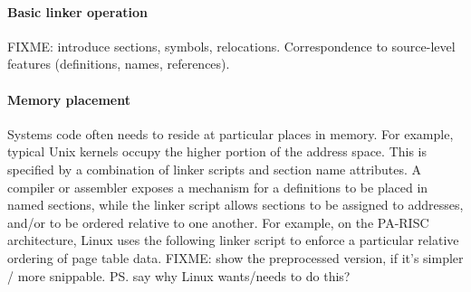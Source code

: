 


% 
% 
% 
% 
% 







\paragraph{Basic linker operation}
FIXME: introduce sections, symbols, relocations.
Correspondence to source-level features (definitions, names, references).

\paragraph{Memory placement}
Systems code often needs to reside at particular places in memory.
For example, typical Unix kernels occupy the higher portion of the address space.
This is specified by a combination of linker scripts and section name attributes. 
A compiler or assembler exposes a mechanism for a definitions to be placed in named sections,
while the linker script allows sections to be assigned to addresses, 
and/or to be ordered relative to one another.
For example, on the PA-RISC architecture, Linux uses the following 
linker script to enforce a particular relative ordering of page table data.
FIXME: show the preprocessed version, if it's simpler / more snippable.
\ps{say why Linux wants/needs to do this?}

